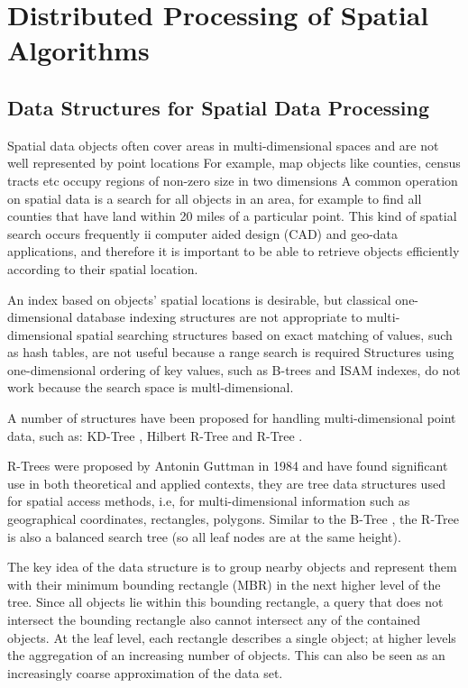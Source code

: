 \section{Distributed Processing of Spatial Algorithms}
\label{sec:spatial_dist}

\subsection{Data Structures for Spatial Data Processing}
\label{sub:spatialdata}

	Spatial data objects often cover areas in multi-dimensional spaces and are not well represented by point locations For example, map objects like counties, census  tracts etc occupy regions of non-zero size  in two dimensions A common operation on spatial data is a search for all objects in an area, for example to find all counties that have land within 20 miles of a particular point. This kind of spatial search occurs frequently ii computer aided design (CAD) and geo-data applications, and therefore it is important to be able to retrieve objects efficiently according to their spatial location. 
	
	An index based on objects' spatial locations is desirable, but classical one-dimensional database indexing structures are not appropriate to multi-dimensional spatial searching structures based on exact matching of values, such as hash tables, are not useful because a range search is required Structures using one-dimensional ordering of key values, such as B-trees and ISAM indexes, do not work because the search space is multl-dimensional. 
		
	A number of structures have been proposed for handling multi-dimensional point data, such as: KD-Tree \cite{bentley1975multidimensional}, Hilbert R-Tree \cite{kamel1994hilbert} and R-Tree \cite{guttman1984r}.
	
	R-Trees were proposed by Antonin Guttman in 1984 and have found significant use in both theoretical and applied contexts, they are tree data structures used for spatial access methods, i.e, for multi-dimensional information such as geographical coordinates, rectangles, polygons. Similar to the B-Tree \cite{comer1979ubiquitous}, the R-Tree is also a balanced search tree (so all leaf nodes are at the same height).

	The key idea of the data structure is to group nearby objects and represent them with their minimum bounding rectangle (MBR) in the next higher level of the tree. Since all objects lie within this bounding rectangle, a query that does not intersect the bounding rectangle also cannot intersect any of the contained objects. At the leaf level, each rectangle describes a single object; at higher levels the aggregation of an increasing number of objects. This can also be seen as an increasingly coarse approximation of the data set.


